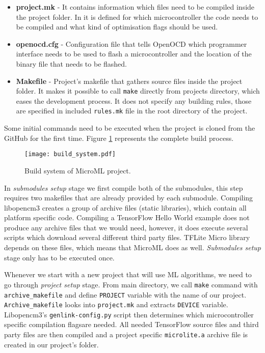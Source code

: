 \begin{itemize}
    \item \textbf{project.mk} - It contains information which files need to be compiled inside the project folder. In it is defined for which microcontroller the code needs to be compiled and what kind of optimisation flags should be used.
    \item \textbf{openocd.cfg} - Configuration file that tells OpenOCD which programmer interface needs to be used to flash a microcontroller and the location of the binary file that needs to be flashed.
    \item \textbf{Makefile} - Project's makefile that gathers source files inside the project folder. It makes it possible to call \verb|make| directly from projects directory, which eases the development process. It does not specify any building rules, those are specified in included \verb|rules.mk| file in the root directory of the project.
\end{itemize}

Some initial commands need to be executed when the project is cloned from the GitHub for the first time. 
Figure \ref{build_system} represents the complete build process.

\begin{figure}[ht]
        \centering
        \texttt{[image: build\_system.pdf]} 
        \caption{ Build system of MicroML project.} 
        \label{build_system}
\end{figure}

In \textit{submodules setup} stage we first compile both of the submodules, this step requires two makefiles that are already provided by each submodule.
Compiling libopencm3 creates a group of archive files (static libraries), which contain all platform specific code.
Compiling a TensorFlow Hello World example does not produce any archive files that we would need, however, it does execute several scripts which download several different third party files.
TFLite Micro library depends on these files, which means that MicroML does as well.
\textit{Submodules setup} stage only has to be executed once.

Whenever we start with a new project that will use ML algorithms, we need to go through \textit{project setup} stage.
From main directory, we call \verb|make| command with \verb|archive_makefile| and define \verb|PROJECT| variable with the name of our project.
\verb|Archive_makefile| looks into \verb|project.mk| and extracts \verb|DEVICE| variable.
Libopencm3's \verb|genlink-config.py| script then determines which microcontroller specific compilation flags\footnotemark are needed. 
All needed TensorFlow source files and third party files are then compiled and a project specific \verb|microlite.a| archive file is created in our project's folder.

